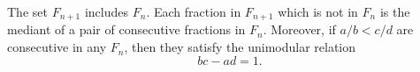 The set $F_{n+1}$ includes $F_n$. Each fraction in $F_{n+1}$ which is not in $F_n$ is the mediant of a pair of consecutive fractions in $F_n$. Moreover, if $a/b < c/d$ are consecutive in any $F_n$, then they satisfy the unimodular relation
$$bc - ad = 1.$$
